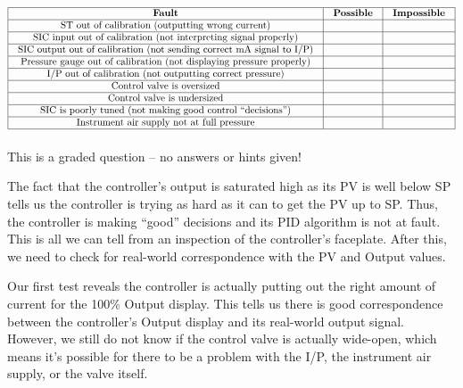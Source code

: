 $$\vbox{\offinterlineskip
\halign{\strut
\vrule \quad\hfil # \ \hfil & 
\vrule \quad\hfil # \ \hfil & 
\vrule \quad\hfil # \ \hfil \vrule \cr
\noalign{\hrule}
%
{\bf Fault} & {\bf Possible} & {\bf Impossible} \cr
%
\noalign{\hrule}
%
ST out of calibration (outputting wrong current) &  &  \cr
%
\noalign{\hrule}
%
SIC input out of calibration (not interpreting signal properly) &  &  \cr
%
\noalign{\hrule}
%
SIC output out of calibration (not sending correct mA signal to I/P) &  &  \cr
%
\noalign{\hrule}
%
Pressure gauge out of calibration (not displaying pressure properly) &  &  \cr
%
\noalign{\hrule}
%
I/P out of calibration (not outputting correct pressure) &  &  \cr
%
\noalign{\hrule}
%
Control valve is oversized &  &  \cr
%
\noalign{\hrule}
%
Control valve is undersized &  &  \cr
%
\noalign{\hrule}
%
SIC is poorly tuned (not making good control ``decisions'') &  &  \cr
%
\noalign{\hrule}
%
Instrument air supply not at full pressure &  &  \cr
%
\noalign{\hrule}
} %
}$$ %







This is a graded question -- no answers or hints given!







The fact that the controller's output is saturated high as its PV is well below SP tells us the controller is trying as hard as it can to get the PV up to SP.  Thus, the controller is making ``good'' decisions and its PID algorithm is not at fault.  This is all we can tell from an inspection of the controller's faceplate.  After this, we need to check for real-world correspondence with the PV and Output values.

\vskip 10pt

Our first test reveals the controller is actually putting out the right amount of current for the 100\% Output display.  This tells us there is good correspondence between the controller's Output display and its real-world output signal.  However, we still do not know if the control valve is actually wide-open, which means it's possible for there to be a problem with the I/P, the instrument air supply, or the valve itself.

